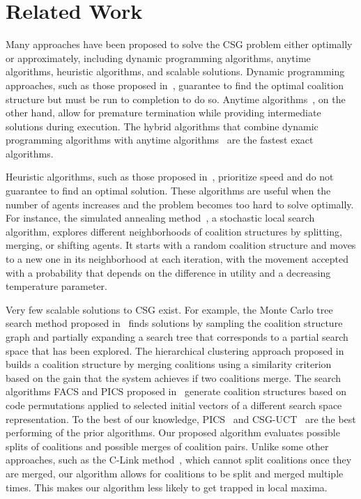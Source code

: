 \section{Related Work}
Many approaches have been proposed to solve the CSG problem either optimally or approximately, including dynamic programming algorithms, anytime algorithms, heuristic algorithms, and scalable solutions. 
Dynamic programming approaches, such as those proposed in~\cite{yeh1986dynamic,rahwan2008improved,michalak2016hybrid}, guarantee to find the optimal coalition structure but must be run to completion to do so. 
Anytime algorithms~\cite{sandholm1999coalition,dang2004generating,rahwan2009anytime}, on the other hand, allow for premature termination while providing intermediate solutions during execution. 
The hybrid algorithms that combine dynamic programming algorithms with anytime algorithms~\cite{michalak2016hybrid,changder2020odss,Changder_Aknine_Ramchurn_Dutta_2021,ijcai2024p27,ijcai2023p35}  are the fastest exact algorithms. 

Heuristic algorithms, such as those proposed in~\cite{sen2000searching,keinanen2009simulated,di2010coalition}, prioritize speed and do not guarantee to find an optimal solution. These algorithms are useful when the number of agents increases and the problem becomes too hard to solve optimally. For instance, the simulated annealing method~\cite{keinanen2009simulated}, a stochastic local search algorithm, explores different neighborhoods of coalition structures by splitting, merging, or shifting agents. It starts with a random coalition structure and moves to a new one in its neighborhood at each iteration, with the movement accepted with a probability that depends on the difference in utility and a decreasing temperature parameter. 

Very few scalable solutions to CSG exist. For example, the Monte Carlo tree search method proposed in~\cite{wu2020monte} finds solutions by sampling the coalition structure graph and partially expanding a search tree that corresponds to a partial search space that has been explored. The hierarchical clustering approach proposed in~\cite{farinelli2013c} builds a coalition structure by merging coalitions using a similarity criterion based on the gain that the system achieves if two coalitions merge. The search algorithms FACS and PICS proposed in~\cite{9643288,10098066} %
generate coalition structures based on code permutations applied to selected initial vectors of a different search space representation. To the best of our knowledge, PICS~\cite{10098066} and CSG-UCT~\cite{wu2020monte} are the best performing of the prior algorithms. 
Our proposed algorithm evaluates possible splits of coalitions and possible merges of coalition pairs. Unlike some other approaches, such as the C-Link method~\cite{farinelli2013c}, which cannot split coalitions once they are merged, our algorithm allows for coalitions to be split and merged multiple times. This makes our algorithm less likely to get trapped in local maxima. 

